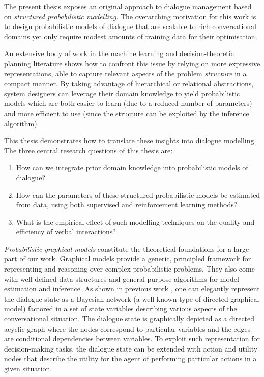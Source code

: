 The present thesis exposes an original approach to dialogue management based on \textit{structured probabilistic modelling}.  The overarching motivation for this work is to design probabilistic models of dialogue that are scalable to rich conversational domains yet only require modest amounts of training data for their optimisation.

An extensive body of work in the machine learning and decision-theoretic planning literature shows how to confront this issue by relying on more expressive representations, able to capture relevant aspects of the problem \textit{structure} in a compact manner. By taking advantage of hierarchical or relational abstractions, system designers can leverage their domain knowledge to yield probabilistic models which are both easier to learn (due to a reduced number of parameters) and more efficient to use (since the structure can be exploited by the inference algorithm).  

This thesis demonstrates how to translate these insights into dialogue modelling.  The three central research questions of this thesis are:
\begin{enumerate}
\item How can we integrate prior domain knowledge into probabilistic models of dialogue?
\item How can the parameters of these structured probabilistic models be estimated from data, using both supervised and reinforcement learning methods?  
\item What is the empirical effect of such modelling techniques on the quality and efficiency of verbal interactions?
\end{enumerate}

\textit{Probabilistic graphical models} \citep{Koller+Friedman:09} constitute the theoretical foundations for a large part of our work.  Graphical models provide a generic, principled framework for representing and reasoning over complex probabilistic problems. They also come with well-defined data structures and general-purpose algorithms for model estimation and inference.  As shown in previous work \citep[see for instance ][]{Thomson:2010:BUD:1772996.1773040}, one can elegantly represent the dialogue state as a Bayesian network (a well-known type of directed graphical model) factored in a set of state variables describing various aspects of the conversational situation.  The dialogue state is graphically depicted as a directed acyclic graph where the nodes correspond to particular variables and the edges are conditional dependencies between variables. To exploit such representation for decision-making tasks, the dialogue state can be extended with action and utility nodes that describe the utility for the agent of performing particular actions in a given situation. 

